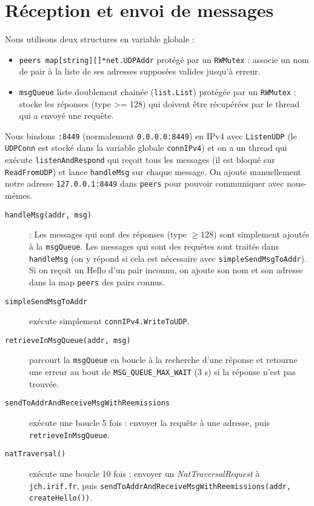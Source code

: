 \section{Réception et envoi de messages}
Nous utilisons deux structures en variable globale :
\begin{itemize}
    \item \texttt{peers map[string][]*net.UDPAddr} protégé par un \texttt{RWMutex} : associe un nom de pair à la liste de ses adresses supposées valides jusqu'à erreur.
    \item \texttt{msgQueue} liste doublement chainée (\texttt{list.List}) protégée par un \texttt{RWMutex} : stocke les réponses (type >= 128) qui doivent être récupérées par le thread qui a envoyé une requête.
\end{itemize}
Nous bindons \texttt{:8449} (normalement \texttt{0.0.0.0:8449}) en IPv4 avec \texttt{ListenUDP} (le \texttt{UDPConn} est stocké dans la variable globale \texttt{connIPv4}) et on a un thread qui exécute \texttt{listenAndRespond} qui reçoit tous les messages (il est bloqué sur \texttt{ReadFromUDP}) et lance \texttt{handleMsg} sur chaque message. On ajoute manuellement notre adresse \texttt{127.0.0.1:8449} dans \texttt{peers} pour pouvoir communiquer avec nous-mêmes.
\begin{description}
    \item[\texttt{handleMsg(addr, msg)}]: Les messages qui sont des réponses (type $\geqslant 128$) sont simplement ajoutés à la \texttt{msgQueue}.
        Les messages qui sont des requêtes sont traités dans \texttt{handleMsg} (on y répond si cela est nécessaire avec \texttt{simpleSendMsgToAddr}). Si on reçoit un Hello d'un pair inconnu, on ajoute son nom et son adresse dans la map \texttt{peers} des pairs connus.
    \item[\texttt{simpleSendMsgToAddr}] exécute simplement \texttt{connIPv4.WriteToUDP}.
    \item [\texttt{retrieveInMsgQueue(addr, msg)}] parcourt la \texttt{msgQueue} en boucle à la recherche d'une réponse et retourne une erreur au bout de \texttt{MSG_QUEUE_MAX_WAIT} (3 s) si la réponse n'est pas trouvée.
    \item[\texttt{sendToAddrAndReceiveMsgWithReemissions}] exécute une boucle 5 fois : envoyer la requête à une adresse, puis \texttt{retrieveInMsgQueue}.
    \item [\texttt{natTraversal()}] exécute une boucle 10 fois : envoyer un \textit{NatTraversalRequest} à \texttt{jch.irif.fr}, puis \texttt{sendToAddrAndReceiveMsgWithReemissions(addr, createHello())}.
\end{description}
